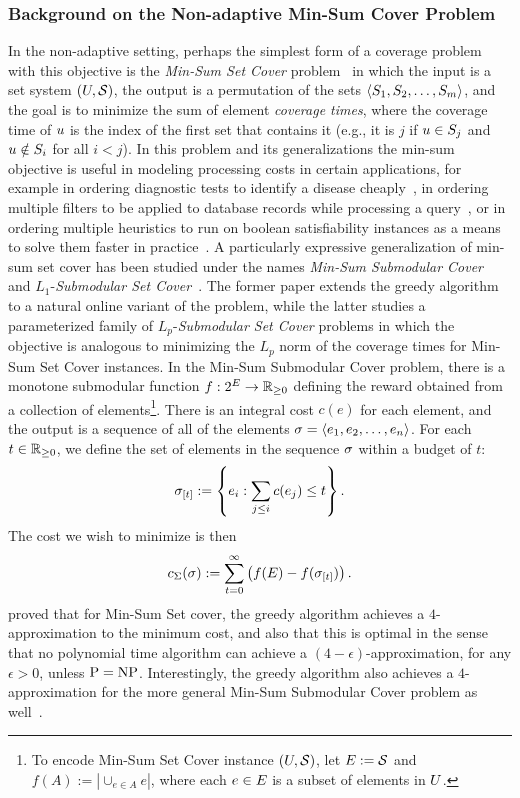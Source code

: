 \subsubsection{Background on the Non-adaptive Min-Sum Cover Problem}
In the non-adaptive setting, perhaps the simplest form of a coverage
problem with this objective is the \emph{Min-Sum Set Cover}
problem~\citep{feige04} in which the input is a set system $(U, {\mathcal{S}})$, the output
is a permutation of the sets $\langle S_1, S_2, \ldots, S_m \rangle$, and the
goal is to minimize the sum of element \emph{coverage times}, where the
coverage time of $u$ is the index of the first set that contains
it (e.g., it is $j$ if $u \in S_j$ and $u \notin S_{i}$ for all $i <
j$).  In this problem and its generalizations 
the min-sum objective is useful in modeling processing costs in
certain applications, for example in ordering diagnostic tests to
identify a disease cheaply~\citep{kaplan05}, in ordering multiple filters to be applied to
database records while processing a query~\citep{munagala05}, or in ordering multiple
heuristics to run on boolean satisfiability instances as a means to
solve them faster in practice~\citep{streeter08}.
A particularly expressive generalization of min-sum set cover has been
studied under the names \emph{Min-Sum Submodular Cover}~\citep{streeter08} and 
$L_1$-\emph{Submodular Set Cover}~\citep{golovin08}.
The former paper extends the greedy algorithm to a natural online variant of the
problem, while the latter studies a parameterized family of
$L_p$-\emph{Submodular Set Cover} problems in which the objective is
analogous to minimizing the $L_p$ norm of the coverage times for 
Min-Sum Set Cover instances.
In the Min-Sum Submodular Cover problem, there is a monotone submodular function $f:2^{E}
\to \mathbb{R}_{\ge 0}$ defining the reward obtained from a collection
of elements\footnote{To encode Min-Sum Set Cover instance
  $(U, {\mathcal{S}})$, let $E := {\mathcal{S}}$ and $f(A) := |\cup_{e \in A} e|$, where each $e \in E$ is a subset of
elements in $U$.}.  
There is an integral cost $c(e)$ for each element, and the output is a
sequence of all of the elements $\sigma = \langle e_1, e_2, \ldots, e_n \rangle$.
For each $t \in \mathbb{R}_{\ge 0}$, we define the set of elements in
the sequence $\sigma$ within a budget of $t$:
\[
 \sigma_{[{t}]}  := \left\{e_i : \sum_{j \le i} c(e_j) \le t \right\}.
\]
The cost we wish to minimize is then 
\begin{equation}
  \label{eqn:min-sum-obj1}
  c_{\Sigma}\! \left( {\sigma} \right)  := \sum_{t = 0}^{\infty}  \left( {f(E) - f( \sigma_{[{t}]} )} \right) .
\end{equation}
\citet{feige04} proved that for Min-Sum Set cover, the greedy
algorithm achieves a $4$-approximation to the minimum cost, and also
that this is optimal in the sense that no polynomial time algorithm can achieve a
$(4-\epsilon)$-approximation, for any $\epsilon > 0$, unless $\textrm{P} = \textrm{NP}$.
Interestingly, the greedy algorithm also achieves a $4$-approximation
for the more general Min-Sum Submodular Cover problem as
well~\citep{streeter08,golovin08}.


